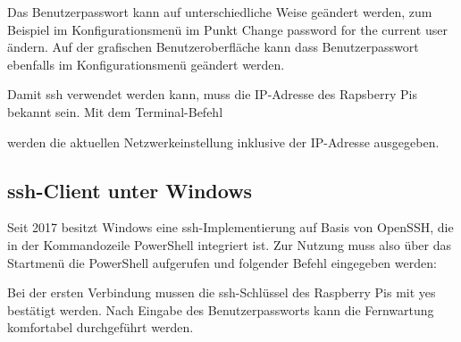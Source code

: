 Das Benutzerpasswort kann auf unterschiedliche Weise geändert werden, zum Beispiel im Konfigurationsmenü 
im Punkt \glqq Change password for the current user\grqq{} ändern. Auf der grafischen Benutzeroberfläche kann 
dass Benutzerpasswort ebenfalls im Konfigurationsmenü geändert werden.



\bigskip

Damit ssh verwendet werden kann, muss die IP-Adresse des Rapsberry Pis bekannt sein. Mit dem Terminal-Befehl

\medskip


\medskip

werden die aktuellen Netzwerkeinstellung inklusive der IP-Adresse ausgegeben.



\subsection{ssh-Client unter Windows}


Seit 2017 besitzt Windows eine ssh-Implementierung auf Basis von OpenSSH, die  in der Kommandozeile PowerShell 
integriert ist. Zur Nutzung muss also über das Startmenü die PowerShell aufgerufen und folgender  Befehl eingegeben werden:

\medskip


\medskip

Bei der ersten Verbindung mussen   die ssh-Schlüssel des Raspberry Pis mit \glqq yes\grqq{} bestätigt werden.
Nach Eingabe des Benutzerpassworts kann die Fernwartung komfortabel durchgeführt werden.